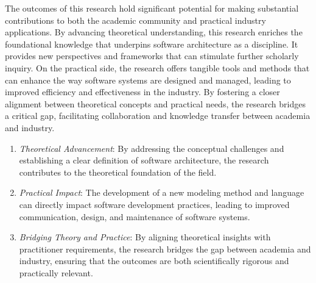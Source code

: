 The outcomes of this research hold significant potential for making substantial contributions to both the academic community and practical industry applications.
By advancing theoretical understanding, this research enriches the foundational knowledge that underpins software architecture as a discipline.
It provides new perspectives and frameworks that can stimulate further scholarly inquiry.
On the practical side, the research offers tangible tools and methods that can enhance the way software systems are designed and managed, leading to improved efficiency and effectiveness in the industry.
By fostering a closer alignment between theoretical concepts and practical needs, the research bridges a critical gap, facilitating collaboration and knowledge transfer between academia and industry.
\begin{enumerate}
  \item \textit{Theoretical Advancement}: By addressing the conceptual challenges and establishing a clear definition of software architecture, the research contributes to the theoretical foundation of the field.
  \item \textit{Practical Impact}: The development of a new modeling method and language can directly impact software development practices, leading to improved communication, design, and maintenance of software systems.
  \item \textit{Bridging Theory and Practice}: By aligning theoretical insights with practitioner requirements, the research bridges the gap between academia and industry, ensuring that the outcomes are both scientifically rigorous and practically relevant.
\end{enumerate}
